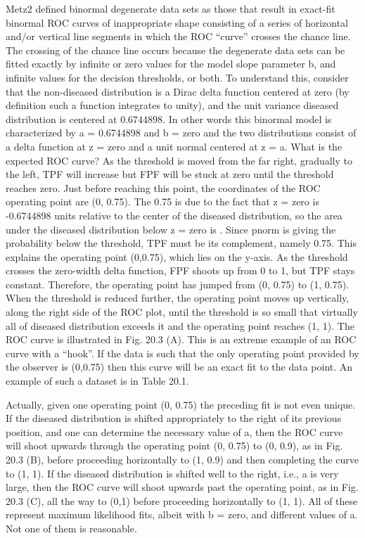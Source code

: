 \documentclass[
]{book}
\begin{document}
Metz2 defined binormal degenerate data sets as those that result in exact-fit binormal ROC curves of inappropriate shape consisting of a series of horizontal and/or vertical line segments in which the ROC ``curve'' crosses the chance line. The crossing of the chance line occurs because the degenerate data sets can be fitted exactly by infinite or zero values for the model slope parameter b, and infinite values for the decision thresholds, or both. To understand this, consider that the non-diseased distribution is a Dirac delta function centered at zero (by definition such a function integrates to unity), and the unit variance diseased distribution is centered at 0.6744898. In other words this binormal model is characterized by a = 0.6744898 and b = zero and the two distributions consist of a delta function at z = zero and a unit normal centered at z = a. What is the expected ROC curve? As the threshold is moved from the far right, gradually to the left, TPF will increase but FPF will be stuck at zero until the threshold reaches zero. Just before reaching this point, the coordinates of the ROC operating point are (0, 0.75). The 0.75 is due to the fact that z = zero is -0.6744898 units relative to the center of the diseased distribution, so the area under the diseased distribution below z = zero is . Since pnorm is giving the probability below the threshold, TPF must be its complement, namely 0.75. This explains the operating point (0,0.75), which lies on the y-axis. As the threshold crosses the zero-width delta function, FPF shoots up from 0 to 1, but TPF stays constant. Therefore, the operating point has jumped from (0, 0.75) to (1, 0.75). When the threshold is reduced further, the operating point moves up vertically, along the right side of the ROC plot, until the threshold is so small that virtually all of diseased distribution exceeds it and the operating point reaches (1, 1). The ROC curve is illustrated in Fig. 20.3 (A). This is an extreme example of an ROC curve with a ``hook''. If the data is such that the only operating point provided by the observer is (0,0.75) then this curve will be an exact fit to the data point. An example of such a dataset is in Table 20.1.

Actually, given one operating point (0, 0.75) the preceding fit is not even unique. If the diseased distribution is shifted appropriately to the right of its previous position, and one can determine the necessary value of a, then the ROC curve will shoot upwards through the operating point (0, 0.75) to (0, 0.9), as in Fig. 20.3 (B), before proceeding horizontally to (1, 0.9) and then completing the curve to (1, 1). If the diseased distribution is shifted well to the right, i.e., a is very large, then the ROC curve will shoot upwards past the operating point, as in Fig. 20.3 (C), all the way to (0,1) before proceeding horizontally to (1, 1). All of these represent maximum likelihood fits, albeit with b = zero, and different values of a. Not one of them is reasonable.
\end{document}
